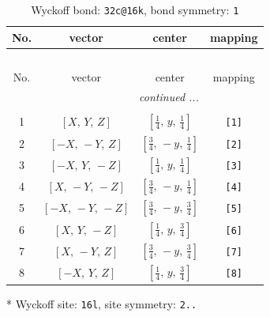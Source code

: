 \documentclass[fleqn,8pt]{jsarticle}
\begin{document}
\renewcommand{\arraystretch}{1.2}
\begin{longtable}{cccc}
\caption{Wyckoff bond: {\tt 32c@16k}, bond symmetry: {\tt 1}}
 \\
 \hline \hline
No. & vector & center & mapping \\ \hline \endfirsthead

\multicolumn{3}{l}{\tablename\ \thetable{}} \\
 \hline \hline
No. & vector & center & mapping \\ \hline \endhead

 \hline \hline
\multicolumn{3}{r}{\footnotesize\it continued ...} \\ \endfoot

 \hline \hline
\multicolumn{3}{r}{} \\ \endlastfoot

1 & $\left[ X,\, Y,\, Z \right]$ & $\left[ \frac{1}{4},\, y,\, \frac{1}{4} \right]$ & {\tt [1]} \\ \hline
2 & $\left[ - X,\, - Y,\, Z \right]$ & $\left[ \frac{3}{4},\, - y,\, \frac{1}{4} \right]$ & {\tt [2]} \\ \hline
3 & $\left[ - X,\, Y,\, - Z \right]$ & $\left[ \frac{1}{4},\, y,\, \frac{1}{4} \right]$ & {\tt [3]} \\ \hline
4 & $\left[ X,\, - Y,\, - Z \right]$ & $\left[ \frac{3}{4},\, - y,\, \frac{1}{4} \right]$ & {\tt [4]} \\ \hline
5 & $\left[ - X,\, - Y,\, - Z \right]$ & $\left[ \frac{3}{4},\, - y,\, \frac{3}{4} \right]$ & {\tt [5]} \\ \hline
6 & $\left[ X,\, Y,\, - Z \right]$ & $\left[ \frac{1}{4},\, y,\, \frac{3}{4} \right]$ & {\tt [6]} \\ \hline
7 & $\left[ X,\, - Y,\, Z \right]$ & $\left[ \frac{3}{4},\, - y,\, \frac{3}{4} \right]$ & {\tt [7]} \\ \hline
8 & $\left[ - X,\, Y,\, Z \right]$ & $\left[ \frac{1}{4},\, y,\, \frac{3}{4} \right]$ & {\tt [8]} \\
\end{longtable}
* Wyckoff site: {\tt 16l}, site symmetry: {\tt 2..}
\renewcommand{\arraystretch}{1.2}
\end{document}
